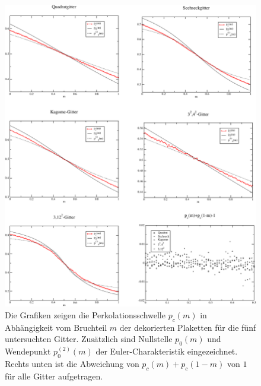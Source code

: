\begin{figure}[htbp]
  \includegraphics{./Schranken-figs/matching}
  \caption{Die Grafiken zeigen die Perkolationsschwelle $p_c(m)$ in Abh\"angigkeit vom Bruchteil $m$ der dekorierten Plaketten f\"ur die f\"unf untersuchten Gitter. Zus\"atzlich sind Nullstelle $p_0(m)$ und Wendepunkt $p_0^{(2)}(m)$ der Euler-Charakteristik eingezeichnet. Rechts unten ist die Abweichung von $p_c(m)+p_c(1-m)$ von $1$ f\"ur alle Gitter aufgetragen.}
\label{fig:dekoratedpc}
\end{figure}
